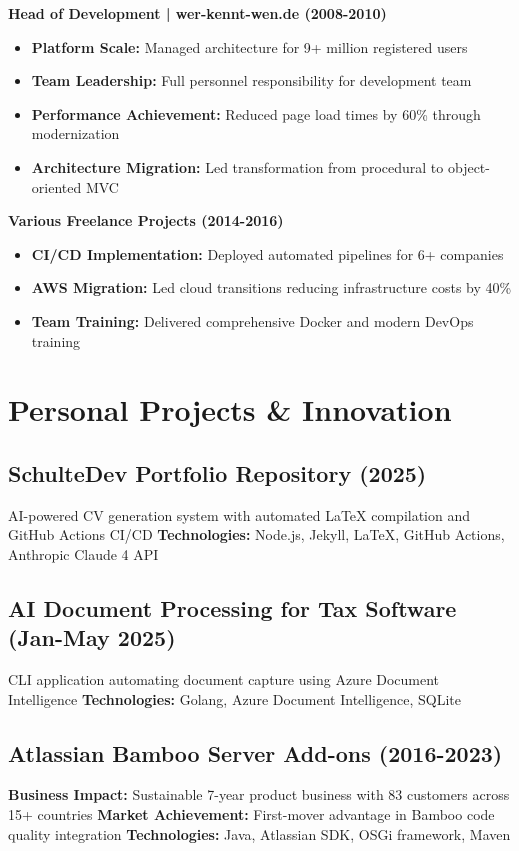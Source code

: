 \documentclass[10pt,a4paper]{article}
\begin{document}
\textbf{Head of Development | wer-kennt-wen.de (2008-2010)}
\begin{itemize}[leftmargin=*,noitemsep,topsep=0pt]
\item \textbf{Platform Scale:} Managed architecture for 9+ million registered users
\item \textbf{Team Leadership:} Full personnel responsibility for development team
\item \textbf{Performance Achievement:} Reduced page load times by 60\% through modernization
\item \textbf{Architecture Migration:} Led transformation from procedural to object-oriented MVC
\end{itemize}

\textbf{Various Freelance Projects (2014-2016)}
\begin{itemize}[leftmargin=*,noitemsep,topsep=0pt]
\item \textbf{CI/CD Implementation:} Deployed automated pipelines for 6+ companies
\item \textbf{AWS Migration:} Led cloud transitions reducing infrastructure costs by 40\%
\item \textbf{Team Training:} Delivered comprehensive Docker and modern DevOps training
\end{itemize}

\newpage

\section{Personal Projects \& Innovation}

\subsection{SchulteDev Portfolio Repository (2025)}
AI-powered CV generation system with automated LaTeX compilation and GitHub Actions CI/CD
\textbf{Technologies:} Node.js, Jekyll, LaTeX, GitHub Actions, Anthropic Claude 4 API

\subsection{AI Document Processing for Tax Software (Jan-May 2025)}
CLI application automating document capture using Azure Document Intelligence
\textbf{Technologies:} Golang, Azure Document Intelligence, SQLite

\subsection{Atlassian Bamboo Server Add-ons (2016-2023)}
\textbf{Business Impact:} Sustainable 7-year product business with 83 customers across 15+ countries
\textbf{Market Achievement:} First-mover advantage in Bamboo code quality integration
\textbf{Technologies:} Java, Atlassian SDK, OSGi framework, Maven
\end{document}
